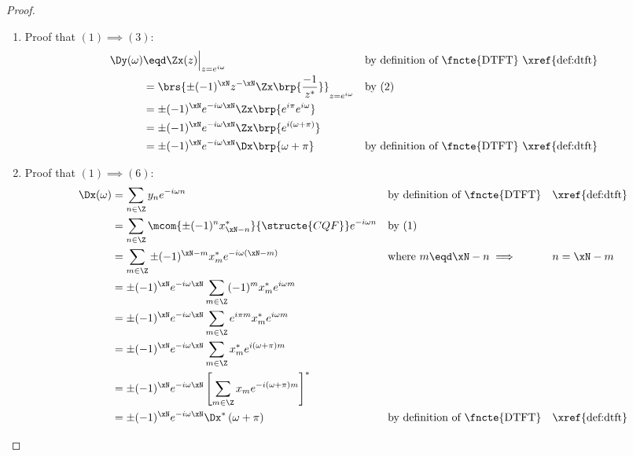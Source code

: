 \begin{proof}
\begin{enumerate}
  \item Proof that $(1)\implies(3)$:
    \begin{align*}
      \Dy(\omega)
        &\eqd \Zx(z)\Big|_{z=e^{i\omega}}
        &&    \text{by definition of \fncte{DTFT} \xref{def:dtft}}
      \\&=    \brs{\pm (-1)^\xN z^{-\xN}\Zx\brp{\frac{-1}{z^\ast}}}_{z=e^{i\omega}}
        &&    \text{by (2)}
      \\&=    \pm (-1)^\xN e^{-i\omega\xN}\Zx\brp{e^{i\pi}e^{i\omega}}
      \\&=    \pm (-1)^\xN e^{-i\omega\xN}\Zx\brp{e^{i(\omega+\pi)}}
      \\&=    \pm (-1)^\xN e^{-i\omega\xN}\Dx\brp{\omega+\pi}
        &&    \text{by definition of \fncte{DTFT} \xref{def:dtft}}
    \end{align*}

  \item Proof that $(1)\implies(6)$:
    \begin{align*}
      \Dx(\omega)
        &= \sum_{n\in\Z}  y_{n}  e^{-i\omega n}
        && \text{by definition of \fncte{DTFT}}
        && \text{\xref{def:dtft}}
      \\&= \sum_{n\in\Z} \mcom{\pm (-1)^n x_{\xN-n}^\ast}{\structe{CQF}} e^{-i\omega n}
        && \text{by (1)}
      \\&= \sum_{m\in\Z}\pm (-1)^{\xN-m} x_m^\ast e^{-i\omega (\xN-m)}
        && \text{where $m\eqd\xN-n \implies$}
        && \text{$n=\xN-m$}
      \\&= \pm (-1)^\xN e^{-i\omega\xN}
           \sum_{m\in\Z}(-1)^m x_m^\ast e^{i\omega m}
      \\&= \pm (-1)^\xN e^{-i\omega\xN}
           \sum_{m\in\Z}e^{i\pi m} x_m^\ast e^{i\omega m}
      \\&= \pm (-1)^\xN e^{-i\omega\xN}
           \sum_{m\in\Z}x_m^\ast e^{i (\omega+\pi )m}
      \\&= \pm (-1)^\xN e^{-i\omega\xN}
           \left[ \sum_{m\in\Z}x_m e^{-i(\omega+\pi )m} \right]^\ast
      \\&= \pm (-1)^\xN e^{-i\omega\xN}\Dx^\ast\left(\omega+\pi \right)
        && \text{by definition of \fncte{DTFT}}
        && \text{\xref{def:dtft}}
    \end{align*}


\end{enumerate}
\end{proof}
